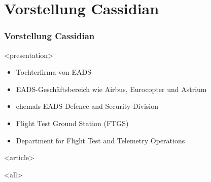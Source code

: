 
\section{Vorstellung Cassidian}

\begin{frame}[fragile]
\frametitle<presentation>{Vorstellung Cassidian}




\mode
<presentation>
\begin{itemize}
\item Tochterfirma von EADS 
\item EADS-Geschäftsbereich wie Airbus, Eurocopter und Astrium
\item ehemals EADS Defence and Security Division
\item Flight Test Ground Station (FTGS)
\item Department for Flight Test and Telemetry Operations
\end{itemize}


\mode
<article>


\mode
<all>

\end{frame}
\newpage
\clearpage
